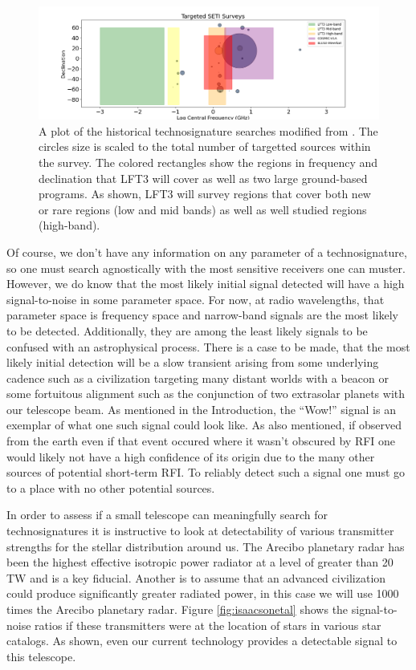 \begin{figure}
    \centering
    \includegraphics[width=0.85\linewidth]{SETI_Bubble_LFT3.png}
    \caption{A plot of the historical technosignature searches modified from \cite{Tremblay_2022}. The circles size is scaled to the total number of targetted sources within the survey. The colored rectangles show the regions in frequency and declination that LFT3 will cover as well as two large ground-based programs. As shown, LFT3 will survey regions that cover both new or rare regions (low and mid bands) as well as well studied regions (high-band).}
    \label{fig:bubbles}
\end{figure}

Of course, we don't have any information on any parameter of a technosignature, so one must search agnostically with the most sensitive receivers one can muster.  However, we do know that the most likely initial signal detected will have a high signal-to-noise in some parameter space. For now, at radio wavelengths, that parameter space is frequency space and narrow-band signals are the most likely to be detected.  Additionally, they are among the least likely signals to be confused with an astrophysical process. There is a case to be made, that the most likely initial detection will be a slow transient arising from some underlying cadence such as a civilization targeting many distant worlds with a beacon or some fortuitous alignment such as the conjunction of two extrasolar planets with our telescope beam.  As mentioned in the Introduction, the ``Wow!'' signal is an exemplar of what one such signal could look like.  As also mentioned, if observed from the earth even if that event occured where it wasn't obscured by RFI one would likely not have a high confidence of its origin due to the many other sources of potential short-term RFI. To reliably detect such a signal one must go to a place with no other potential sources.

In order to assess if a small telescope can meaningfully search for technosignatures it is instructive to look at detectability of various transmitter strengths for the stellar distribution around us. The Arecibo planetary radar has been the highest effective isotropic power radiator at a level of greater than 20 TW and is a key fiducial. Another is to assume that an advanced civilization could produce significantly greater radiated power, in this case we will use 1000 times the Arecibo planetary radar.  Figure \ref{fig:isaacsonetal} shows the signal-to-noise ratios if these transmitters were at the location of stars in various star catalogs.  As shown, even our current technology provides a detectable signal to this telescope.

